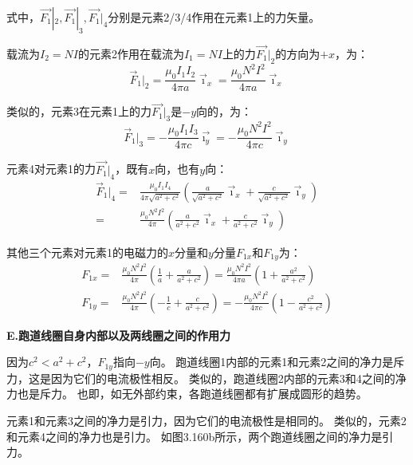 式中，$\vec{F_1}|_2, \vec{F_1}|_3, \vec{F_1}|_4$分别是元素2/3/4作用在元素1上的力矢量。

载流为$I_2=NI$的元素2作用在载流为$I_1=NI$上的力$\vec{F_1}|_2$的方向为$+x$，为：
\begin{equation}
\vec{F}_{1}|_{2}=\frac{\mu_{0}I_{1}I_{2}}{4\pi a}\vec{\imath}_{x}=\frac{\mu_{0}N^{2}I^{2}}{4\pi a}\vec{\imath}_{x}%
\end{equation}

类似的，元素3在元素1上的力$\vec{F_1}|_3$是$-y$向的，为：
\begin{equation*}
\vec{F}_{1}|_{3}=-\frac{\mu_{0}I_{1}I_{3}}{4\pi c}\vec{\imath_{y}}=-\frac{\mu_{0}N^{2}I^{2}}{4\pi c}\vec{\imath}_{y}\tag{3.159b}%
\end{equation*}

元素4对元素1的力$\vec{F_1}|_4$，既有$x$向，也有$y$向：
\begin{equation*}
\begin{split}
\vec{F}_{1}|_{4}=&\frac{\mu_{0}I_{1}I_{4}}{4\pi\sqrt{a^{2}+c^{2}}}(\frac{a}{\sqrt{a^{2}+c^{2}}}\vec{\imath}_{x}+\frac{c}{\sqrt{a^{2}+c^{2}}}\vec{\imath}_{y})\\
=&\frac{\mu_{0}N^{2}I^{2}}{4\pi}(\frac{a}{a^{2}+c^{2}}\vec{\imath}_{x}+\frac{c}{a^{2}+c^{2}}\vec{\imath}_{y})%
\end{split}\tag{3.159c}
\end{equation*}

其他三个元素对元素1的电磁力的$x$分量和$y$分量$F_{1x}$和$F_{1y}$为：
\begin{subequations}
	\begin{align}
F_{1x}=&\frac{\mu_{0}N^{2}I^{2}}{4\pi}(\frac{1}{a}+\frac{a}{a^{2}+c^{2}})=\frac{\mu_{0}N^{2}I^{2}}{4\pi a}(1+\frac{a^{2}}{a^{2}+c^{2}})\\%
F_{1y}=&\frac{\mu_{0}N^{2}I^{2}}{4\pi}(-\frac{1}{c}+\frac{c}{a^{2}+c^{2}})=-\frac{\mu_{0}N^{2}I^{2}}{4\pi c}(1-\frac{c^{2}}{a^{2}+c^{2}})%
\end{align}
\end{subequations}

\textbf{E.跑道线圈自身内部以及两线圈之间的作用力}

因为$c^2 < a^2+c^2$，$F_{1y}$指向$-y$向。
跑道线圈1内部的元素1和元素2之间的净力是斥力，这是因为它们的电流极性相反。
类似的，跑道线圈2内部的元素3和4之间的净力也是斥力。
也即，如无外部约束，各跑道线圈都有扩展成圆形的趋势。

元素1和元素3之间的净力是引力，因为它们的电流极性是相同的。
类似的，元素2和元素4之间的净力也是引力。
如图3.160b所示，两个跑道线圈之间的净力是引力。




